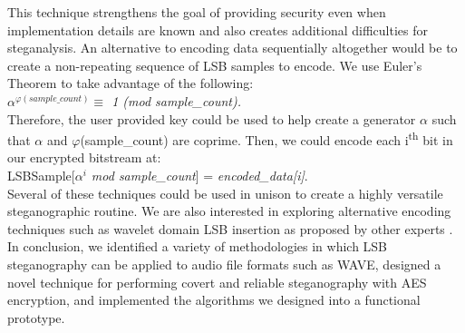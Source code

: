 This technique strengthens the goal of providing security even when implementation details are known and also creates additional difficulties for steganalysis. An alternative to encoding data sequentially altogether would be to create a non-repeating sequence of LSB samples to encode. We use Euler's Theorem to take advantage of the following: \\ \textit{$\alpha ^{\varphi(sample\_count)} \equiv$ 1 (mod sample\_count).}
\vspace{2 mm} \\
Therefore, the user provided key could be used to help create a generator $\alpha$ such that $\alpha$ and $\varphi$(sample\_count) are coprime. Then, we could encode each i\textsuperscript{th} bit in our encrypted bitstream at: \\
LSBSample[\textit{$\alpha ^{i}$ mod sample\_count}] = \textit{encoded\_data[i]}.
\vspace{2 mm} \\
Several of these techniques could be used in unison to create a highly versatile steganographic routine. We are also interested in exploring alternative encoding techniques such as wavelet domain LSB insertion as proposed by other experts \cite{paper7}. In conclusion, we identified a variety of methodologies in which LSB steganography can be applied to audio file formats such as WAVE, designed a novel technique for performing covert and reliable steganography with AES encryption, and implemented the algorithms we designed into a functional prototype.
